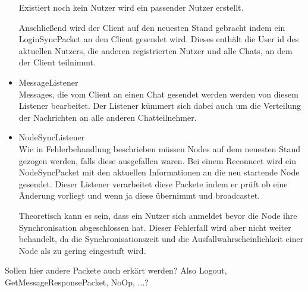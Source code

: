 \begin{itemize}
        
        Existiert noch kein Nutzer wird ein passender Nutzer erstellt.
        
        Anschließend wird der Client auf den neuesten Stand gebracht indem ein LoginSyncPacket an den Client gesendet wird. Dieses enthält die User id des aktuellen Nutzers, die anderen registrierten Nutzer und alle Chats, an dem der Client teilnimmt.
        
    \item MessageListener\\
        Messages, die vom Client an einen Chat gesendet werden werden von diesem Listener bearbeitet. Der Listener kümmert sich dabei auch um die Verteilung der Nachrichten an alle anderen Chatteilnehmer.
        
    \item NodeSyncListener\\
        Wie in Fehlerbehandlung beschrieben müssen Nodes auf dem neuesten Stand gezogen werden, falls diese ausgefallen waren. Bei einem Reconnect wird ein NodeSyncPacket mit den aktuellen Informationen an die neu startende Node gesendet. Dieser Listener verarbeitet diese Packete indem er prüft ob eine Änderung vorliegt und wenn ja diese übernimmt und broadcastet. 
        
        Theoretisch kann es sein, dass ein Nutzer sich anmeldet bevor die Node ihre Synchronisation abgeschlossen hat. Dieser Fehlerfall wird aber nicht weiter behandelt, da die Synchronisationszeit und die Ausfallwahrscheinlichkeit einer Node als zu gering eingestuft wird.
\end{itemize}


Sollen hier andere Packete auch erkärt werden? Also Logout, GetMessageResponsePacket, NoOp, ...?

